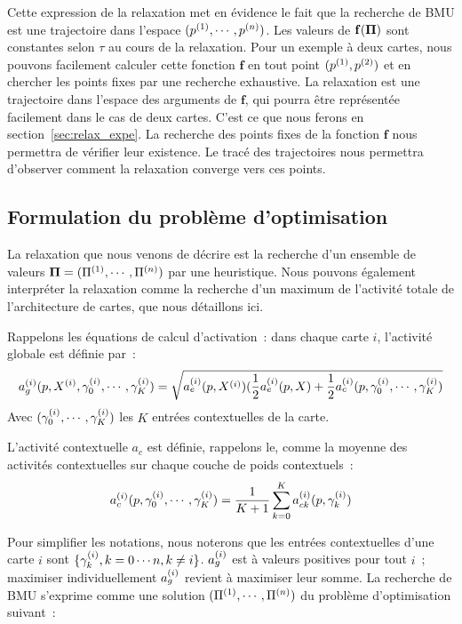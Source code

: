 \documentclass[../main]{subfiles}
\begin{document}
Cette expression de la relaxation met en évidence le fait que la recherche de BMU est une trajectoire dans l'espace $(p^{({1})}, \cdots, p^{({n})})$. Les valeurs de $\mathbf{f}(\mathbf{\Pi})$ sont constantes selon $\tau$ au cours de la relaxation.
Pour un exemple à deux cartes, nous pouvons facilement calculer cette fonction $\mathbf{f}$ en tout point $(p^{({1})}, p^{({2})})$ et en chercher les points fixes par une recherche exhaustive. 
La relaxation est une trajectoire dans l'espace des arguments de $\mathbf{f}$, qui pourra être représentée facilement dans le cas de deux cartes.
C'est ce que nous ferons en section~\ref{sec:relax_expe}.
La recherche des points fixes de la fonction $\mathbf{f}$ nous permettra de vérifier leur existence. Le tracé des trajectoires nous permettra d'observer comment la relaxation converge vers ces points.

\subsection{Formulation du problème d'optimisation}\label{sec:formulation_argmax}

La relaxation que nous venons de décrire est la recherche d'un ensemble de valeurs $\mathbf{\Pi} = (\Pi^{({1})}, \cdots, \Pi^{({n})})$ par une heuristique.
Nous pouvons également interpréter la relaxation comme la recherche d'un maximum de l'activité totale de l'architecture de cartes, que nous détaillons ici. 

Rappelons les équations de calcul d'activation~:
dans chaque carte $i$, l'activité globale est définie par~:
\begin{equation}\label{eq:ag}
	a_g^{({i})}(p, X^{({i})}, \gamma^{({i})}_0, \cdots, \gamma^{({i})}_K) = \sqrt{a_e^{({i})}(p,X^{({i})})(\frac{1}{2}a_e^{({i})}(p,X) + \frac{1}{2}a_c^{({i})}(p,\gamma^{({i})}_0, \cdots, \gamma^{({i})}_K)}
\end{equation}
Avec $(\gamma^{({i})}_0, \cdots, \gamma^{({i})}_K)$ les $K$ entrées contextuelles de la carte. 

L'activité contextuelle $a_c$ est définie, rappelons le, comme la moyenne des activités contextuelles sur chaque couche de poids contextuels~:
\begin{equation}
	a_c^{({i})}(p, \gamma^{({i})}_0, \cdots, \gamma^{({i})}_K) = \frac{1}{K+1}\sum_{k=0}^{K}{a_{ck}^{({i})}(p, \gamma^{({i})}_k)}
\end{equation}

Pour simplifier les notations, nous noterons que les entrées contextuelles d'une carte $i$ sont $\{ \gamma^{({i})}_k, k = 0 \cdots n , k \neq i  \}$.
$a_g^{({i})}$ est à valeurs positives pour tout $i$~; maximiser individuellement $a_g^{({i})}$ revient à maximiser leur somme.
La recherche de BMU s'exprime comme une solution $(\Pi^{({1})}, \cdots, \Pi^{({n})})$ du problème d'optimisation suivant~:
\end{document}
